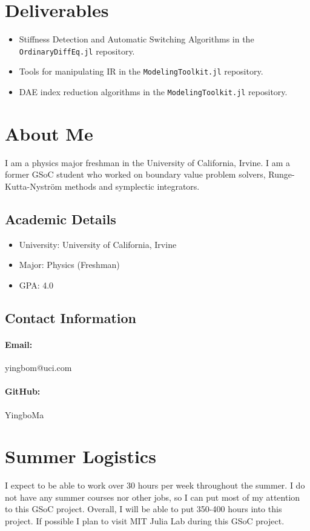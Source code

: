 \documentclass[12pt,a4paper]{article}
\begin{document}
\section{Deliverables}
\begin{itemize}
  \item Stiffness Detection and Automatic Switching Algorithms in
    the \texttt{OrdinaryDiffEq.jl} repository.
  \item Tools for manipulating IR in the \texttt{ModelingToolkit.jl}
    repository.
  \item DAE index reduction algorithms in the \texttt{ModelingToolkit.jl}
    repository.
\end{itemize}

\section{About Me}
I am a physics major freshman in the University of California, Irvine. I am a
former GSoC student who worked on boundary value problem solvers,
Runge-Kutta-Nystr{\"o}m methods and symplectic integrators.

\subsection{Academic Details}
\begin{itemize}
  \item University: University of California, Irvine
  \item Major: Physics (Freshman)
  \item GPA: 4.0
\end{itemize}

\subsection{Contact Information}
\paragraph{Email:} yingbom@uci.com
\paragraph{GitHub:} YingboMa

\section{Summer Logistics}
I expect to be able to work over 30 hours per week throughout the summer. I do
not have any summer courses nor other jobs, so I can put most of my attention
to this GSoC project. Overall, I will be able to put 350-400 hours into this
project. If possible I plan to visit MIT Julia Lab during this GSoC project.


\end{document}
